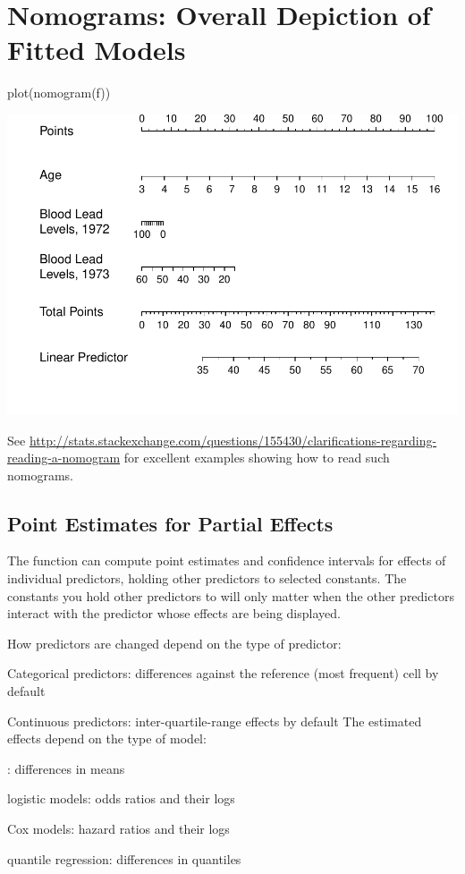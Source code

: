 \section{Nomograms: Overall Depiction of Fitted Models} \ipacue
\begin{Schunk}
\begin{Sinput}
plot(nomogram(f))
\end{Sinput}


\centerline{\includegraphics[width=\maxwidth]{rmsintro-unnamed-chunk-17-1} }

\end{Schunk}
See
\url{http://stats.stackexchange.com/questions/155430/clarifications-regarding-reading-a-nomogram}
for excellent examples showing how to read such nomograms.

\subsection{Point Estimates for Partial Effects} \ipacue
The  function can compute point estimates and confidence
intervals for effects of individual predictors, holding other
predictors to selected constants.  The constants you hold other
predictors to will only matter when the other predictors interact with
the predictor whose effects are being displayed.

How predictors are changed depend on the type of predictor:
\bi
\item Categorical predictors: differences against the reference (most
  frequent) cell by default
\item Continuous predictors: inter-quartile-range effects by default
\ei
The estimated effects depend on the type of model:
\bi
\item {}: differences in means
\item logistic models: odds ratios and their logs
\item Cox models: hazard ratios and their logs
\item quantile regression: differences in quantiles
\ei

